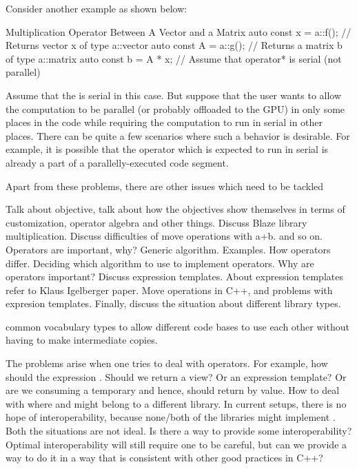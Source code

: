 \documentclass[oneside,11pt,a4paper]{jbarticle}
\begin{document}
Consider another example as shown below:
\begin{codecpp}{Multiplication Operator Between A Vector and a Matrix}
  auto const x = a::f();  // Returns vector x of type a::vector
  auto const A = a::g();  // Returns a matrix b of type a::matrix
  auto const b = A * x;   // Assume that operator* is serial (not parallel)
\end{codecpp}
Assume that the  is serial in this case. But suppose that
the user wants to allow the computation to be parallel (or probably offloaded to
the GPU) in only some places in the code while requiring the computation to run
in serial in other places. There can be quite a few scenarios where such a
behavior is desirable. For example, it is possible that the operator which is
expected to run in serial is already a part of a parallelly-executed code
segment.

Apart from these problems, there are other issues which need to be
tackled

Talk about objective, talk about how the objectives show themselves in terms of
customization, operator algebra and other things. Discuss Blaze library
multiplication. Discuss difficulties of move operations with a+b. and so on.
Operators are important, why? Generic algorithm. Examples. How operators
differ.  Deciding which algorithm to use to implement operators. Why are
operators important? Discuss expression templates.
About expression templates refer to Klaus Igelberger paper. Move operations in
C++, and problems with expresion templates. Finally, discuss the situation about
different library types.

common vocabulary types to allow different code bases to use each other without
having to make intermediate copies.


The problems arise when one tries to deal with operators. For example, how
should the expression . Should we return a view? Or an
expression template? Or are we consuming a temporary and hence, should return by
value. How to deal with  where  and 
might belong to a different library. In current setups, there is no hope of
interoperability, because none/both of the libraries might implement
. Both the situations are not ideal.
Is there a way to provide some interoperability? Optimal interoperability will
still require one to be careful, but can we provide a way to do it in a way that
is consistent with other good practices in C++?
\end{document}

